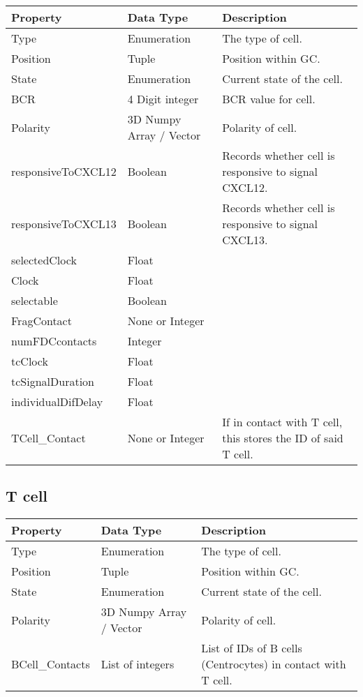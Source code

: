 \documentclass[english]{article}
\begin{document}
\begin{center}
\begin{tabular}{|C{2.1in}|C{2.1in}|C{2.1in}|}

\hline
\textbf{Property} & \textbf{Data Type} & \textbf{Description}
\tabularnewline
\hline
\hline
Type & Enumeration & The type of cell. 
\tabularnewline
\hline
Position & Tuple & Position within GC.
\tabularnewline
\hline
State & Enumeration & Current state of the cell. 
\tabularnewline
\hline
BCR & 4 Digit integer & BCR value for cell.
\tabularnewline
\hline
Polarity & 3D Numpy Array / Vector & Polarity of cell.
\tabularnewline
\hline
responsiveToCXCL12 & Boolean & Records whether cell is responsive to signal CXCL12.
\tabularnewline
\hline
responsiveToCXCL13 & Boolean & Records whether cell is responsive to signal CXCL13.
\tabularnewline
\hline
selectedClock & Float &
\tabularnewline
\hline
Clock & Float &
\tabularnewline
\hline
selectable & Boolean &
\tabularnewline
\hline
FragContact & None or Integer & 
\tabularnewline
\hline
numFDCcontacts & Integer &
\tabularnewline
\hline
tcClock & Float &
\tabularnewline
\hline
tcSignalDuration & Float &
\tabularnewline
\hline
individualDifDelay & Float &
\tabularnewline
\hline
TCell\_Contact & None or Integer & If in contact with T cell, this stores the ID of said T cell. 
\tabularnewline
\hline
\end{tabular}
\end{center}

\subsection{T cell}
\begin{center}
\begin{tabular}{|C{2.1in}|C{2.1in}|C{2.1in}|}
\hline
\textbf{Property} & \textbf{Data Type} & \textbf{Description}
\tabularnewline
\hline
\hline
Type & Enumeration & The type of cell. 
\tabularnewline
\hline
Position & Tuple & Position within GC.
\tabularnewline
\hline
State & Enumeration & Current state of the cell.
\tabularnewline
\hline
Polarity & 3D Numpy Array / Vector & Polarity of cell.
\tabularnewline
\hline
BCell\_Contacts & List of integers & List of IDs of B cells (Centrocytes) in contact with T cell. 
\tabularnewline
\hline

\end{tabular}
\end{center}
\end{document}
